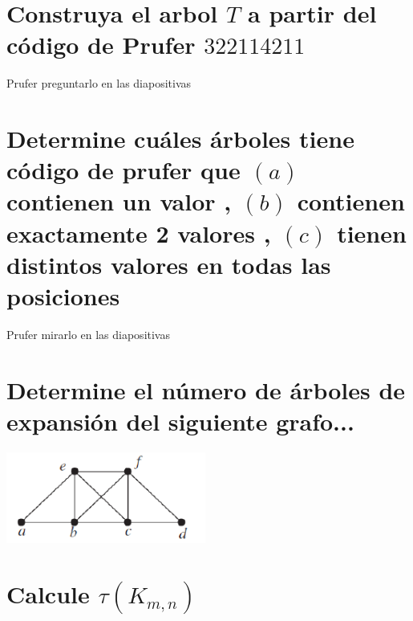 \documentclass[10pt,a4paper]{article} %
\begin{document}

    \section{Construya el arbol $T$ a partir del código de Prufer $322114211$}
        \color{red} Prufer preguntarlo en las diapositivas  \color{black}





    \section{Determine cuáles árboles tiene código de prufer que $(a)$
    contienen un valor , $(b)$ contienen exactamente 2 valores , $(c)$ tienen
    distintos valores en todas las posiciones}
        \color{red} Prufer  mirarlo en las diapositivas\color{black}




    \section{Determine el número de árboles de expansión del siguiente grafo...}
       \begin{center}
            \includegraphics[width=0.5\linewidth]{grafop7.png}
       \end{center}





   \section{Calcule $ \tau  (K_{m,n})$}



\end{document}

